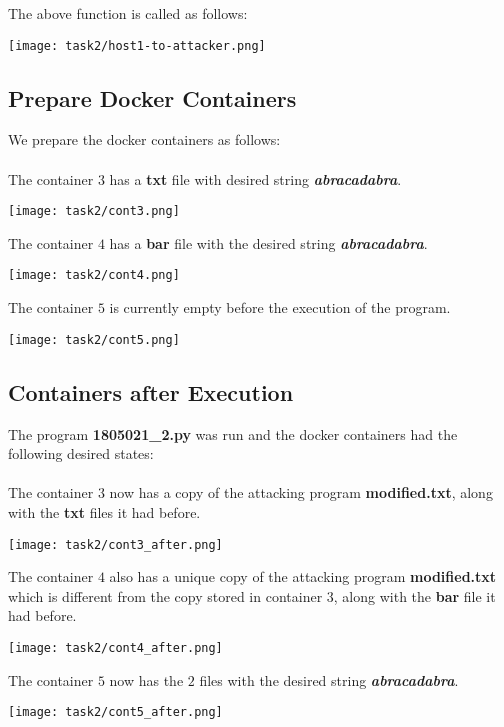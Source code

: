 \documentclass{article}
\begin{document}
The above function is called as follows:
\begin{center}
    \texttt{[image: task2/host1-to-attacker.png]}
\end{center}

\subsection{Prepare Docker Containers}
We prepare the docker containers as follows:\\\\
The container $3$ has a \textbf{txt} file with desired string \textbf{\textit{abracadabra}}.
\begin{center}
    \texttt{[image: task2/cont3.png]}
\end{center}
The container $4$ has a \textbf{bar} file with the desired string \textbf{\textit{abracadabra}}.
\begin{center}
    \texttt{[image: task2/cont4.png]}
\end{center}
The container $5$ is currently empty before the execution of the program.
\begin{center}
    \texttt{[image: task2/cont5.png]}
\end{center}


\subsection{Containers after Execution}
The program \textbf{1805021\_2.py} was run and the docker containers had the following desired states:\\\\

The container $3$ now has a copy of the attacking program \textbf{modified.txt}, along with the \textbf{txt} files it had before. 
\begin{center}
    \texttt{[image: task2/cont3\_after.png]}
\end{center}

The container $4$ also has a unique copy of the attacking program \textbf{modified.txt} which is different from the copy stored in container $3$, along with the \textbf{bar} file it had before. 
\begin{center}
    \texttt{[image: task2/cont4\_after.png]}
\end{center}

The container $5$ now has the $2$ files with the desired string \textbf{\textit{abracadabra}}.
\begin{center}
    \texttt{[image: task2/cont5\_after.png]}
\end{center}
\end{document}
